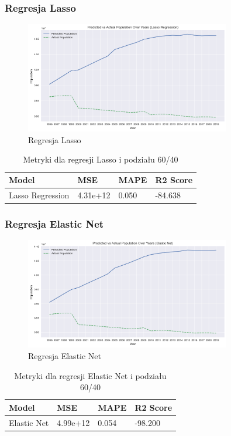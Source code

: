 \documentclass[11pt]{article}
\begin{document}
\subsubsection*{Regresja Lasso}
\begin{figure}[H]
        \centering
        \includegraphics[width=0.8\textwidth]{images/lasso996.png}
        \caption{Regresja Lasso}
\end{figure}
\begin{table}[H]
        \centering
        \begin{tabular}{|l|l|l|l|}
        \hline
        Model & MSE & MAPE & R2 Score \\ \hline
        Lasso Regression & 4.31e+12 & 0.050 & -84.638 \\ \hline
        \end{tabular}
        \caption{Metryki dla regresji Lasso i podziału 60/40}
\end{table}
\subsubsection*{Regresja Elastic Net}
\begin{figure}[H]
        \centering
        \includegraphics[width=0.8\textwidth]{images/elastic_net996.png}
        \caption{Regresja Elastic Net}
\end{figure}
\begin{table}[H]
        \centering
        \begin{tabular}{|l|l|l|l|}
        \hline
        Model & MSE & MAPE & R2 Score \\ \hline
        Elastic Net & 4.99e+12 & 0.054 & -98.200 \\ \hline
        \end{tabular}
        \caption{Metryki dla regresji Elastic Net i podziału 60/40}
\end{table}
\end{document}
